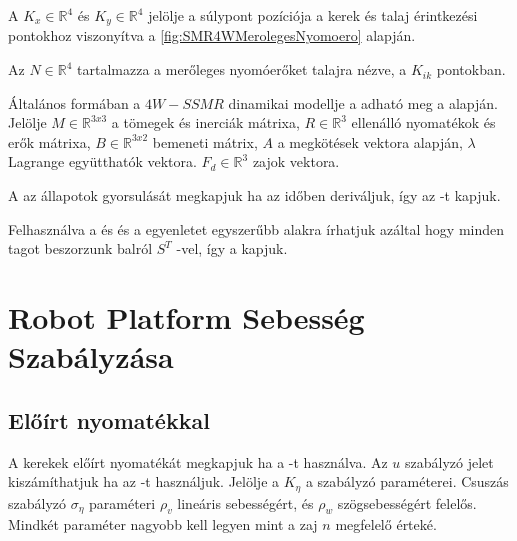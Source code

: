 A $K_x\in \mathbb{R}^4$ és $K_y\in \mathbb{R}^4$ jelölje a súlypont pozíciója a kerek és talaj érintkezési pontokhoz viszonyítva a \ref{fig:SMR4WMerolegesNyomoero} alapján.

Az $N \in \mathbb{R}^4$ tartalmazza a merőleges nyomóerőket talajra nézve, a $K_{ik}$ pontokban. 



Általános formában a $4W-SSMR$ dinamikai modellje a  adható meg a \cite{RobustMotionControl} alapján. Jelölje $M \in \mathbb{R}^{3x3}$ a tömegek és inerciák mátrixa, $R \in \mathbb{R}^{3}$ ellenálló nyomatékok és erők mátrixa,  $B \in \mathbb{R}^{3x2}$ bemeneti mátrix, $A$ a megkötések vektora  alapján, $\lambda$ Lagrange együtthatók vektora. $F_d \in \mathbb{R}^{3}$ zajok vektora.

A   az állapotok gyorsulását megkapjuk ha az  időben deriváljuk, így az -t kapjuk.

Felhasználva a   és  és  a  egyenletet egyszerűbb alakra írhatjuk azáltal hogy minden tagot beszorzunk balról $S^T$ -vel, így a  kapjuk.




\section{Robot Platform Sebesség Szabályzása}


\subsection{Előírt nyomatékkal}

A kerekek előírt nyomatékát megkapjuk ha a   -t használva. Az $u$ szabályzó jelet kiszámíthatjuk ha az -t használjuk. Jelölje a $K_\eta$ a szabályzó paraméterei. Csuszás szabályzó  $\sigma_\eta$ paraméteri $\rho_v$ lineáris sebességért, és $\rho_w$ szögsebességért felelős. Mindkét paraméter nagyobb kell legyen mint a zaj $n$ megfelelő érteké.

\renewcommand{\img}{SajatRobot/SzerkAbrak/SebContRefNyom.tex}
\renewcommand{\sources}{*}
\renewcommand{\captionn}{Kinematikai modell az $SSMR$ típusú $MR$ robotnak.}
\renewcommand{\figlabel}{DinamicSpeedController}




